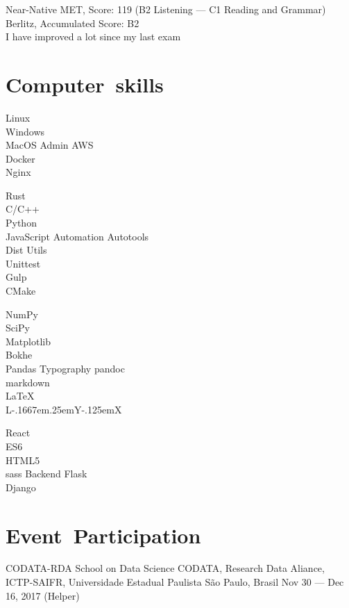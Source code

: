 \documentclass[12pt,english]{moderncv}
\makeatletter
\providecommand{\LyX}{\texorpdfstring%
  {L\kern-.1667em\lower.25em\hbox{Y}\kern-.125emX\@}
  {LyX}}
\makeatother
\begin{document}
           {Near-Native}
           {%
               MET, Score: 119 (B2 Listening --- C1 Reading and Grammar)\\
               Berlitz, Accumulated Score: B2\\
               I have improved a lot since my last exam
           }

\section{Computer~skills}

            {Linux\\Windows\\MacOS}
           {Admin}         {AWS\\Docker\\Nginx}

   {Rust\\C/C++\\Python\\JavaScript}
           {Automation}    {Autotools\\Dist Utils\\Unittest\\Gulp\\CMake}

    {NumPy\\SciPy\\Matplotlib\\Bokhe\\Pandas}
           {Typography}    {pandoc\\markdown\\\LaTeX{}\\\LyX{}}


    {React\\ES6\\HTML5\\sass}
           {Backend}       {Flask\\Django}


\section{Event~Participation}

        {CODATA-RDA School on Data Science}
        {CODATA, Research Data Aliance, ICTP-SAIFR, Universidade Estadual Paulista}
        {São Paulo, Brasil}
        {Nov 30 --- Dec 16, 2017}
        {(Helper)}
\end{document}

